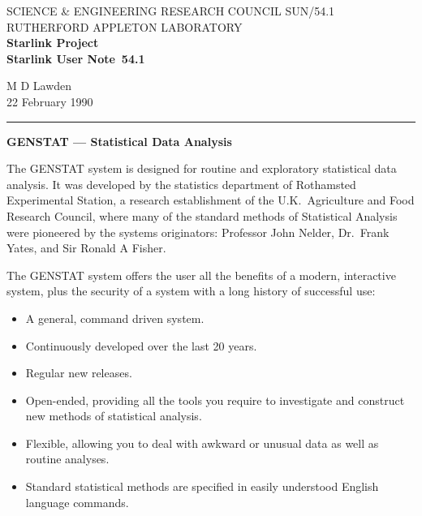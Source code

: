 \pagestyle{myheadings}

\newcommand{\stardoccategory}  {Starlink User Note}
\newcommand{\stardocinitials}  {SUN}
\newcommand{\stardocnumber}    {54.1}
\newcommand{\stardocauthors}   {M D Lawden}
\newcommand{\stardocdate}      {22 February 1990}
\newcommand{\stardoctitle}     {GENSTAT --- Statistical Data Analysis}

\newcommand{\stardocname}{\stardocinitials /\stardocnumber}
\markright{\stardocname}
\setlength{\textwidth}{160mm}
\setlength{\textheight}{240mm}
\setlength{\topmargin}{-5mm}
\setlength{\oddsidemargin}{0mm}
\setlength{\evensidemargin}{0mm}
\setlength{\parindent}{0mm}
\setlength{\parskip}{\medskipamount}
\setlength{\unitlength}{1mm}


\thispagestyle{empty}
SCIENCE \& ENGINEERING RESEARCH COUNCIL \hfill \stardocname\\
RUTHERFORD APPLETON LABORATORY\\
{\large\bf Starlink Project\\}
{\large\bf \stardoccategory\ \stardocnumber}
\begin{flushright}
\stardocauthors\\
\stardocdate
\end{flushright}
\vspace{-4mm}
\rule{\textwidth}{0.5mm}
\vspace{5mm}
\begin{center}
{\Large\bf \stardoctitle}
\end{center}
\vspace{5mm}

The GENSTAT system is designed for routine and exploratory statistical data
analysis.
It was developed by the statistics department of Rothamsted Experimental
Station, a research establishment of the U.K.\ Agriculture and Food
Research Council, where many of the standard methods of Statistical Analysis
were pioneered by the systems originators: Professor John Nelder, Dr.\ Frank
Yates, and Sir Ronald A Fisher.

The GENSTAT system offers the user all the benefits of a modern, interactive
system, plus the security of a system with a long history of successful use:
\begin{itemize}
\item A general, command driven system.
\item Continuously developed over the last 20 years.
\item Regular new releases.
\item Open-ended, providing all the tools you require to investigate and
construct new methods of statistical analysis.
\item Flexible, allowing you to deal with awkward or unusual data as well as
routine analyses.
\item Standard statistical methods are specified in easily understood
English language commands.
\end{itemize}

